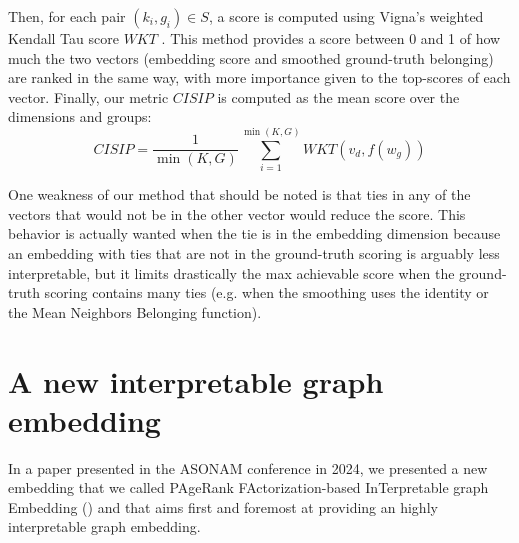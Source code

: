 Then, for each pair $(k_i, g_i) \in S$, a score is computed using Vigna's weighted Kendall Tau score $WKT$ \cite{vigna_2015}. This method provides a score between 0 and 1 of how much the two vectors (embedding score and smoothed ground-truth belonging) are ranked in the same way, with more importance given to the top-scores of each vector. Finally, our metric $CISIP$ is computed as the mean score over the dimensions and groups:
\begin{equation}
    CISIP = \frac{1}{\min(K, G)}\sum_{i=1}^{\min(K, G)}WKT(v_d, f(w_g))
\end{equation}

One weakness of our method that should be noted is that ties in any of the vectors that would not be in the other vector would reduce the score. This behavior is actually wanted when the tie is in the embedding dimension because an embedding with ties that are not in the ground-truth scoring is arguably less interpretable, but it limits drastically the max achievable score when the ground-truth scoring contains many ties (e.g. when the smoothing uses the identity or the Mean Neighbors Belonging function).

\section{A new interpretable graph embedding}%

In a paper presented in the ASONAM conference in 2024, we presented a new embedding that we called PAgeRank FActorization-based InTerpretable graph Embedding (\parfaite{}) and that aims first and foremost at providing an highly interpretable graph embedding.

